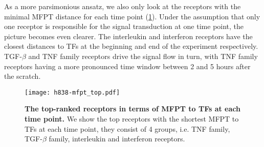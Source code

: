As a more parsimonious ansatz, we also only look at the receptors with the 
minimal MFPT distance for each time point (\ref{fig:h838_mfpt_top}).
Under the assumption that only one receptor is responsible for the 
signal transduction at one time point, the picture becomes even clearer.
The interleukin and interferon receptors have the closest distances to
TFs at the beginning and end of the experiment respectively. TGF-$\beta$
and TNF family receptors drive the signal flow in turn, with TNF family
receptors having a more pronounced time window between 2 and 5 hours
after the scratch.

\begin{figure}[!ht]
\begin{center}
\texttt{[image: h838-mfpt\_top.pdf]}
\end{center}
\caption[Receptors with the shortest MFPT at each time point]{
{\bf The top-ranked receptors in terms of MFPT to TFs at each time point.} 
We show the top receptors with the shortest MFPT to TFs at each time point,
they consist of 4 groups, i.e. TNF family, TGF-$\beta$ family, interleukin and
interferon receptors.
}
\label{fig:h838_mfpt_top}
\end{figure}


